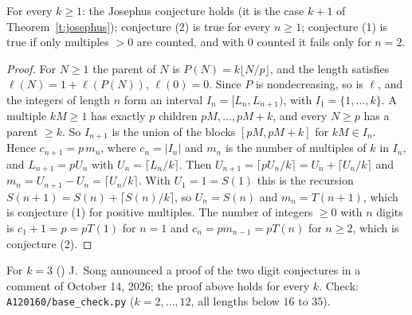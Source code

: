 \begin{theorem}\label{t:A120160} For every $k\ge1$: the Josephus conjecture holds (it is the case $k+1$ of
Theorem~\ref{t:josephus}); conjecture (2) is true for every $n\ge1$; conjecture (1) is true if only multiples
$>0$ are counted, and with $0$ counted it fails only for $n=2$.\end{theorem}
\begin{proof} For $N\ge1$ the parent of $N$ is $P(N)=k\lfloor N/p\rfloor$, and the length satisfies
$\ell(N)=1+\ell(P(N))$, $\ell(0)=0$. Since $P$ is nondecreasing, so is $\ell$, and the integers of length $n$
form an interval $I_n=[L_n,L_{n+1})$, with $I_1=\{1,\dots,k\}$. A multiple $kM\ge1$ has exactly $p$ children
$pM,\dots,pM+k$, and every $N\ge p$ has a parent $\ge k$. So $I_{n+1}$ is the union of the blocks $[pM,pM+k]$
for $kM\in I_n$. Hence $c_{n+1}=p\,m_n$, where $c_n=|I_n|$ and $m_n$ is the number of multiples of $k$ in $I_n$,
and $L_{n+1}=pU_n$ with $U_n=\lceil L_n/k\rceil$. Then $U_{n+1}=\lceil pU_n/k\rceil=U_n+\lceil U_n/k\rceil$ and
$m_n=U_{n+1}-U_n=\lceil U_n/k\rceil$. With $U_1=1=S(1)$ this is the recursion $S(n+1)=S(n)+\lceil S(n)/k\rceil$,
so $U_n=S(n)$ and $m_n=T(n+1)$, which is conjecture (1) for positive multiples. The number of integers
$\ge0$ with $n$ digits is $c_1+1=p=pT(1)$ for $n=1$ and $c_n=pm_{n-1}=pT(n)$ for $n\ge2$, which is
conjecture (2). \end{proof}
For $k=3$ () J.~Song announced a proof of the two digit conjectures in a comment of October
14, 2026; the proof above holds for every $k$. Check: \texttt{A120160/base\_check.py} ($k=2,\dots,12$, all
lengths below $16$ to $35$).

